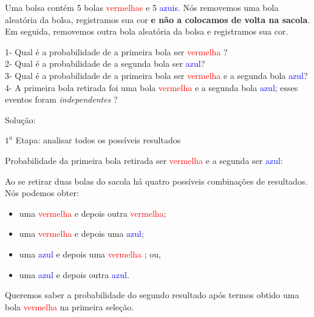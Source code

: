\documentclass[
]{book}
\providecommand{\tightlist}{%
  \setlength{\itemsep}{0pt}\setlength{\parskip}{0pt}}
\begin{document}
Uma bolsa contém 5 bolas \textcolor{red}{vermelhas} e 5 \textcolor{blue}{azuis}. Nós removemos uma bola aleatória da bolsa, registramos sua cor \textbf{e não a colocamos de volta na sacola}. Em seguida, removemos outra bola aleatória da bolsa e registramos sua cor.

\hfill\break

1- Qual é a probabilidade de a primeira bola ser \textcolor{red}{vermelha} ?\\
2- Qual é a probabilidade de a segunda bola ser \textcolor{blue}{azul}?\\
3- Qual é a probabilidade de a primeira bola ser \textcolor{red}{vermelha} e a segunda bola \textcolor{blue}{azul}?\\
4- A primeira bola retirada foi uma bola \textcolor{red}{vermelha} e a segunda bola \textcolor{blue}{azul}; esses eventos foram \emph{independentes} ?

\hfill\break

Solução:

\hfill\break

\(1^{a}\) Etapa: analisar todos os possíveis resultados

\hfill\break

Probabilidade da primeira bola retirada ser \textcolor{red}{vermelha} e a segunda ser \textcolor{blue}{azul}:

\hfill\break

Ao se retirar duas bolas do sacola há quatro possíveis combinações de resultados. Nós podemos obter:

\hfill\break

\begin{itemize}
\tightlist
\item
  uma \textcolor{red}{vermelha} e depois outra \textcolor{red}{vermelha};\\
\item
  uma \textcolor{red}{vermelha} e depois uma \textcolor{blue}{azul};\\
\item
  uma \textcolor{blue}{azul} e depois uma \textcolor{red}{vermelha} ; ou,\\
\item
  uma \textcolor{blue}{azul} e depois outra \textcolor{blue}{azul}.
\end{itemize}

\hfill\break

Queremos saber a probabilidade do segundo resultado após termos obtido uma bola \textcolor{red}{vermelha} na primeira seleção.
\end{document}
